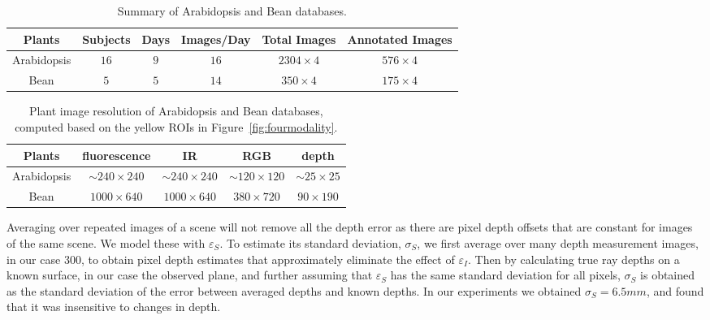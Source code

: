 \begin{table*}[t!]
\begin{center}
\caption{Summary of Arabidopsis and Bean databases.}
\label{tab:stat}
\begin{tabular}{c|c|c|c|c|c}
\hline
Plants & Subjects & Days & Images/Day & Total Images & Annotated Images \\
\hline
Arabidopsis & $16$ & $9$ & $16$ & $2304\times 4$ & $576\times 4$ \\
\hline
Bean & $5$ & $5$ & $14$ & $350\times 4$ & $175\times 4$ \\
\hline
\end{tabular}
\end{center}
\end{table*}



\begin{table*}
\begin{center}
\caption{Plant image resolution of Arabidopsis and Bean databases, computed based on the yellow ROIs in Figure~\ref{fig:fourmodality}.}
\label{tab:resolution}
\begin{tabular}{c|c|c|c|c}
\hline
Plants & fluorescence & IR & RGB & depth \\
\hline
Arabidopsis & $\sim$$240\times240$ & $\sim$$240\times240$ & $\sim$$120\times120$ & $\sim$$25\times25$ \\
Bean & $1000\times640$ & $1000\times640$ & $380\times720$ & $90\times190$ \\
\hline
\end{tabular}
\end{center}
\end{table*}

Averaging over repeated images of a scene will not remove all the depth error as there are pixel depth offsets that are constant for images of the same scene. We model these with $\varepsilon_S$. To estimate its standard deviation, $\sigma_S$, we first average over many depth measurement images, in our case 300, to obtain pixel depth estimates that approximately eliminate the effect of $\varepsilon_I$. Then by calculating true ray depths on a known surface, in our case the observed plane, and further assuming that $\varepsilon_S$ has the same standard deviation for all pixels, $\sigma_S$ is obtained as the standard deviation of the error between averaged depths and known depths. In our experiments we obtained $\sigma_S=6.5mm$, and found that it was insensitive to changes in depth.


